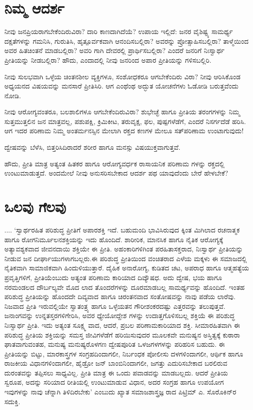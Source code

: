 \section{ನಿಮ್ಮ ಆದರ್ಶ}

ನೀವು ಜನಪ್ರಿಯರಾಗಬೇಕೆಂದಿರುವಿರಾ? ದಾರಿ ಕಾಣದಾಗಿದೆಯೆ? ಉಪಾಯ ಇಲ್ಲಿದೆ: ಜನರ ವೈಶಿಷ್ಟ್ಯ ಸಾಮರ್ಥ್ಯ ದಕ್ಷತೆಗಳನ್ನು ಗಮನಿಸಿ, ಗುರುತಿಸಿ, ಹೃತ್ಪೂರ್ವಕವಾಗಿ ಆನಂದಿಸಬಲ್ಲಿರಾ? ಅವರನ್ನು ಪ್ರೋತ್ಸಾಹಿಸಬಲ್ಲಿರಾ? ತಾಳ್ಮೆಯಿಂದ ಅವರ ಹಿತಚಿಂತನೆ ಮಾಡಬಲ್ಲಿರಾ? ಅವರಿ ಗಾಗಿ ದೇವರಲ್ಲಿ ಪ್ರಾರ್ಥಿಸಬಲ್ಲಿರಾ? ಎಂದರೆ ಜನರಿಗೆ ನಿಃಸ್ವಾರ್ಥ ಪ್ರೀತಿಯನ್ನು ನೀಡಬಲ್ಲಿರಾ? ಹೌದು, ಎಂದಾದಲ್ಲಿ ನೀವು ಜನರಿಂದ ಅಪಾರ ಪ್ರೀತಿಯನ್ನು ಗಳಿಸಬಲ್ಲಿರಿ.

ನೀವು ಸುಲಭವಾಗಿ ಒಳ್ಳೆಯ ಚಿಂತನಶೀಲ ವ್ಯಕ್ತಿಗಳೂ, ಸಂಶೋಧಕರೂ ಆಗಬೇಕೆಂದಿರು ವಿರಾ? ನೀವು ಆರಿಸಿಕೊಂಡ ಅಧ್ಯಯನದ ವಿಷಯವನ್ನು ಮನಸಾರೆ ಪ್ರೀತಿಸಿರಿ. ಆಗ ಎಂಥೆಂಥ ಅದ್ಭುತ ಯೋಚನೆಗಳು ಓಡೋಡಿ ಬರುತ್ತವೆಂದು ನೋಡಿ.

ನೀವು ಆರೋಗ್ಯವಂತರೂ, ಬಲಶಾಲಿಗಳೂ ಆಗಬೇಕೆಂದಿರುವಿರಾ? ಶುಭೇಚ್ಛೆ ಹಾಗೂ ಪ್ರೀತಿಯ ತರಂಗಗಳನ್ನು ನಿಮ್ಮ ಸುತ್ತಮುತ್ತಲಿನ ಜನ ಮಾತ್ರವಲ್ಲ, ಪಶುಪಕ್ಷಿ, ಕ್ರಿಮಿಕೀಟ, ತರುವೃಕ್ಷ, ಫಲ, ಪುಷ್ಪಗಳೆಡೆಗೆ, ಎಂದರೆ ನಿಸರ್ಗದೆಡೆ ಹರಿಸಿ. ಆಗ ಇದರ ಪರಿಣಾಮ ನಿಮ್ಮ ಅಂತರ್ಮನಸ್ಸಿನ ಮೇಲಾಗಿ ರಕ್ತದ ಕಣಗಳ ಮೇಲೂ ಸತ್​ಪರಿಣಾಮ ಉಂಟಾಗುವುದು!

ದ್ವೇಷವನ್ನು ಬೆಳೆಸಿ, ಬಿತ್ತರಿಸಿದಿರಾದರೆ ಶರೀರ ಹಾಗೂ ಮನಸ್ಸು ವಿಷಯುಕ್ತವಾಗುತ್ತವೆ.

ಹೌದು, ಪ್ರೀತಿ ಮಾತ್ರ ಅತ್ಯಂತ ಹಿತಕರ ಹಾಗೂ ಆರೋಗ್ಯವರ್ಧಕ ರಾಸಾಯನಿಕ ಪರಿಣಾಮ ಗಳನ್ನು ರಕ್ತದಲ್ಲಿ ಉಂಟುಮಾಡುತ್ತದೆ. ಅಂದಮೇಲೆ ನೀವು ಅನುಸರಿಸಬೇಕಾದ ಆದರ್ಶ ಪಥ ಯಾವುದೆಂದು ಬೇರೆ ಹೇಳಬೇಕೆ?


\section{ಒಲವು ಗೆಲವು}

.... ‘ಸ್ವಾರ್ಥರಹಿತ ಪರಿಶುದ್ಧ ಪ್ರೀತಿಗೆ ಅಪಾರಶಕ್ತಿ ಇದೆ. ಬಹುಮಂದಿ ಭಾವಿಸಿರುವುದ ಕ್ಕಿಂತ ಮಿಗಿಲಾದ ರಚನಾತ್ಮಕ ಹಾಗೂ ರೋಗನಿರ್ಮೂಲನಶಕ್ತಿಯನ್ನು ಇದು ಹೊಂದಿದೆ. ಶಾರೀರಿಕ, ಮಾನಸಿಕ ಹಾಗೂ ನೈತಿಕ ಆರೋಗ್ಯಕ್ಕೆ ಅತ್ಯಾವಶ್ಯಕವಾದ ಜೀವನದಾಯಿ ಶಕ್ತಿಯೇ ಈ ಪ್ರೀತಿ. ಅಹಂಕಾರಿಗಳಿಗಿಂತ ಪರಹಿತಾಸಕ್ತರಾದ, ನಿಃಸ್ವಾರ್ಥ ಪ್ರೀತಿಯನ್ನು ನೀಡುವ ಜನ ದೀರ್ಘಾಯುಗಳಾಗಬಲ್ಲರು.ಈ ಪರಿಶುದ್ಧ ಪ್ರೀತಿಯಿಂದ ವಂಚಿತರಾದ ಎಳೆಯ ಮಕ್ಕಳು ಈ ಸಮಾಜದಲ್ಲಿ ನೈತಿಕವಾಗಿ ಸಾಮಾಜಿಕವಾಗಿ ಹಿಂದುಳಿಯುತ್ತಾರೆ. ದೈಹಿಕ ಅನಾರೋಗ್ಯ, ಕುಡಿತದ ಚಟ, ಅಪರಾಧ ಹಾಗೂ ಆತ್ಮಹತ್ಯೆಯ ಪ್ರವೃತ್ತಿಗಳಿಗೆ, ಪ್ರೀತಿಯೆಂಬುದು ಅತ್ಯಂತ ಪರಿಣಾಮ ಕಾರಿಯಾದ ದಿವ್ಯೌಷಧ. ಅದು ದ್ವೇಷ, ಭಯ ಹಾಗೂ ನರಮಂಡಲದ ದೌರ್ಬಲ್ಯವೇ ಮೊದ ಲಾದ ತೊಂದರೆಗಳನ್ನು ದೂರಮಾಡಬಲ್ಲ ಸಾಮರ್ಥ್ಯವನ್ನು ಹೊಂದಿದೆ. ಇಂತಹ ಪರಿಶುದ್ಧ ಪ್ರೀತಿಯನ್ನು ಹೊಂದದೇ ದಿವ್ಯವಾದ ಹಾಗೂ ಚಿರಂತನವಾದ ಸಂತೋಷವನ್ನು ನಾವು ಪಡೆಯ ಲಾರೆವು. ನಿಜವಾದ ಪ್ರೀತಿ ಇರುವಲ್ಲಿಯೇ ಸ್ವಾತಂತ್ರ್ಯ ಹಾಗೂ ಒಳ್ಳೆಯತನ ಗೌರೀಶಂಕರದಷ್ಟು ಎತ್ತರವನ್ನು ತಲುಪುತ್ತವೆ. ಜನಾಂಗವನ್ನು ಉನ್ನತಸ್ತರಗಳಿಗೇರಿಸಿ, ಅವರ ಧ್ಯೇಯೋದ್ದೇಶ ಗಳನ್ನು ಉದಾತ್ತಗೊಳಿಸಬಲ್ಲ ಶಕ್ತಿಯೆ ಈ ಪರಿಶುದ್ಧ ನಿಃಸ್ವಾರ್ಥ ಪ್ರೀತಿ. ಇದು ಅತ್ಯಂತ ಸೂಕ್ಷ್ಮ ವಾದ, ಆದರೆ, ಪ್ರಬಲ ಪರಿಣಾಮಕಾರಿಯಾದ ಶಕ್ತಿ. ಸೀಮಾರಹಿತವಾಗಿ ಈ ಪರಿಶುದ್ಧ ಪ್ರೀತಿಯ ಶಕ್ತಿಯನ್ನು ಸಮಸ್ತ ಜೀವಿಗಳೆಡೆಗೆ ಹರಿಯಿಸುವುದರ ಮೂಲಕವೇ ಮನುಷ್ಯನ ಅಸ್ತಿತ್ವಕ್ಕೆ ಕುಠಾರಾ ಘಾತವಾಗುವಂತಹ, ಮನುಷ್ಯ ಮನುಷ್ಯರೊಳಗಣ ದ್ವೇಷಪೂರಿತ ಒಳಜಗಳಗಳನ್ನು ಪರಿಹರಿಸ ಬಹುದು. ಈ ಪ್ರೀತಿಯನ್ನು ಬಿಟ್ಟು, ಮಾರಕಾಸ್ತ್ರಗಳ ಸಂಗ್ರಹದಿಂದಾಗಲೀ, ನಿರ್ಬಂಧಕ ಪೋಲೀಸು ದಳಗಳಿಂದಾಗಲೀ, ಆರ್ಥಿಕ ಹಾಗೂ ರಾಜಕೀಯ ವಿಧಾನಗಳಿಂದಾಗಲೀ, ಹೈಡ್ರೋ ಜನ್ ಬಾಂಬಿನಿಂದಾಗಲೀ, ಜಗತ್ತು ಎದುರಿಸಬೇಕಾದ ಬರಲಿರುವ ದುರಂತವನ್ನು ತಪ್ಪಿಸಲು ಸಾಧ್ಯವಿಲ್ಲ. ಪ್ರೀತಿ ಮಾತ್ರ ಈ ಒಂದು ಪವಾಡವನ್ನು ಮಾಡಬಲ್ಲದು. ಆದರೆ ಪ್ರೀತಿಯ ಸ್ವರೂಪ, ಅದನ್ನು ಸರಿಯಾದ ರೀತಿಯಲ್ಲಿ ಉಂಟುಮಾಡುವ ವಿಧಾನ, ಅದರ ಸಂಗ್ರಹ ಹಾಗೂ ಉಪಯೋಗ ಇವುಗಳನ್ನು ನಾವು ಚೆನ್ನಾಗಿ ತಿಳಿದಿರಬೇಕು’ ಎಂಬುದು ಖ್ಯಾತ ಸಮಾಜಶಾಸ್ತ್ರಜ್ಞ ರಾದ ಪಿಟ್ರಿಮ್ ಎ. ಸೊರೊಕಿನ್​ರ ಸದುಕ್ತಿ.

